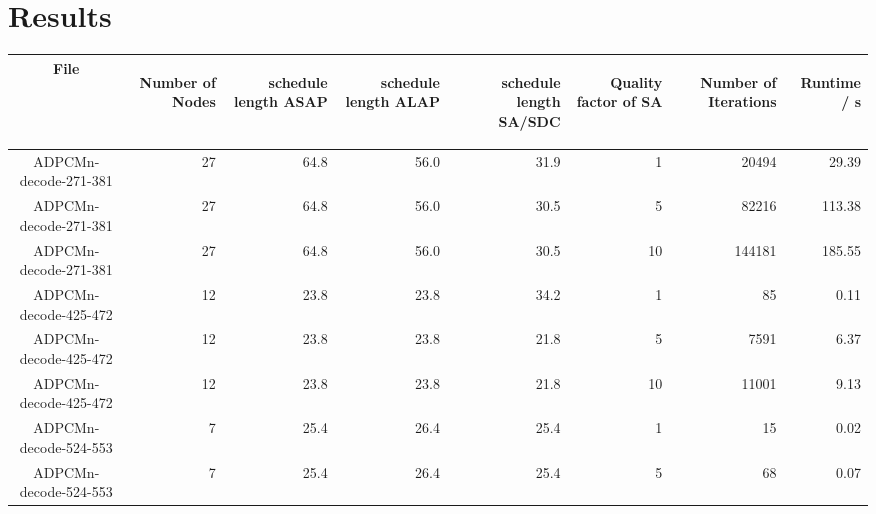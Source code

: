 \documentclass[colorback,accentcolor=tud1c,11pt]{tudreport}
\begin{document}
  \chapter{Results}
  \vspace{100pt}
  \begin{tabular}{ c | r | r | r | r | r | r | r }
    File &
    \begin{rotate}{60} Number of Nodes \end{rotate} \hspace{3pt} &
    \begin{rotate}{60} schedule length ASAP \end{rotate} \hspace{10pt} &
    \begin{rotate}{60} schedule length ALAP \end{rotate} \hspace{10pt} &
    \begin{rotate}{60} schedule length SA/SDC \end{rotate} \hspace{10pt} &
    \begin{rotate}{60} Quality factor of SA \end{rotate} \hspace{3pt} &
    \begin{rotate}{60} Number of Iterations \end{rotate} \hspace{12pt} &
    \begin{rotate}{60} Runtime / s \end{rotate} \hspace{12pt} \\
   \hline
   ADPCMn-decode-271-381 & 27 & 64.8 & 56.0 & 31.9 & 1 & 20494 & 29.39 \\
   ADPCMn-decode-271-381 & 27 & 64.8 & 56.0 & 30.5 & 5 & 82216 & 113.38 \\
   ADPCMn-decode-271-381 & 27 & 64.8 & 56.0 & 30.5 & 10 & 144181 & 185.55 \\
   ADPCMn-decode-425-472 & 12 & 23.8 & 23.8 & 34.2 & 1 & 85 & 0.11 \\
   ADPCMn-decode-425-472 & 12 & 23.8 & 23.8 & 21.8 & 5 & 7591 & 6.37 \\
   ADPCMn-decode-425-472 & 12 & 23.8 & 23.8 & 21.8 & 10 & 11001 & 9.13 \\
   ADPCMn-decode-524-553 & 7 & 25.4 & 26.4 & 25.4 & 1 & 15 & 0.02 \\
   ADPCMn-decode-524-553 & 7 & 25.4 & 26.4 & 25.4 & 5 & 68 & 0.07 \\

\end{tabular}
\end{document}
